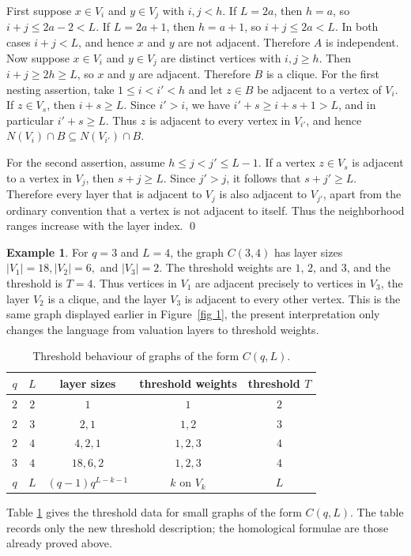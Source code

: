 \documentclass[12pt]{article}
\theoremstyle{definition}
\newtheorem{example}[theorem]{Example}
\renewenvironment{proof}{{\bf \noindent Proof.}}{\qed}
\begin{document}
\begin{proof}
	First suppose $x\in V_i$ and $y\in V_j$ with $i,j<h$.  If $L=2a$, then $h=a$, so $i+j\le2a-2<L$.  If $L=2a+1$, then $h=a+1$, so $i+j\le2a<L$.  In both cases $i+j<L$, and hence $x$ and $y$ are not adjacent.  Therefore $A$ is independent.
	Now suppose $x\in V_i$ and $y\in V_j$ are distinct vertices with $i,j\ge h$.  Then $i+j\ge2h\ge L$, so $x$ and $y$ are adjacent.  Therefore $B$ is a clique.
	For the first nesting assertion, take $1\le i<i'<h$ and let $z\in B$ be adjacent to a vertex of $V_i$.  If $z\in V_s$, then $i+s\ge L$.  Since $i'>i$, we have $i'+s\ge i+s+1>L$, and in particular $i'+s\ge L$.  Thus $z$ is adjacent to every vertex in $V_{i'}$, and hence $N(V_i)\cap B\subseteq N(V_{i'})\cap B$.
	
	\medskip
	
	For the second assertion, assume $h\le j<j'\le L-1$.  If a vertex $z\in V_s$ is adjacent to a vertex in $V_j$, then $s+j\ge L$.  Since $j'>j$, it follows that $s+j'\ge L$.  Therefore every layer that is adjacent to $V_j$ is also adjacent to $V_{j'}$, apart from the ordinary convention that a vertex is not adjacent to itself.  Thus the neighborhood ranges increase with the layer index.
\end{proof}

\medskip


\medskip

\begin{example}\label{ex:threshold-C34-short}
	For $q=3$ and $L=4$, the graph $C(3,4)$ has layer sizes
	$ |V_1|=18, 
	|V_2|=6, $ and $
	|V_3|=2. $
	The threshold weights are $1$, $2$, and $3$, and the threshold is $T=4$.  Thus vertices in $V_1$ are adjacent precisely to vertices in $V_3$, the layer $V_2$ is a clique, and the layer $V_3$ is adjacent to every other vertex.  This is the same graph displayed earlier in Figure~\ref{fig 1}, the present interpretation only changes the language from valuation layers to threshold weights.
\end{example}

\medskip

\begin{table}[H]
	\centering
	\begin{tabular}{c c c c c}
		\toprule
		$q$ & $L$ & layer sizes & threshold weights & threshold $T$ \\
		\midrule
		$2$ & $2$ & $1$ & $1$ & $2$ \\
		$2$ & $3$ & $2,1$ & $1,2$ & $3$ \\
		$2$ & $4$ & $4,2,1$ & $1,2,3$ & $4$ \\
		$3$ & $4$ & $18,6,2$ & $1,2,3$ & $4$ \\
		$q$ & $L$ & $(q-1)q^{L-k-1}$ & $k$ on $V_k$ & $L$ \\
		\bottomrule
	\end{tabular}
	\caption{Threshold behaviour of graphs of the form $C(q,L)$.}
	\label{tab:threshold-data-only}
\end{table}
Table \ref{tab:threshold-data-only} gives the threshold data for small graphs of the form $C(q,L)$.  The table records only the new threshold description; the homological formulae are those already proved above.
\medskip
\end{document}

